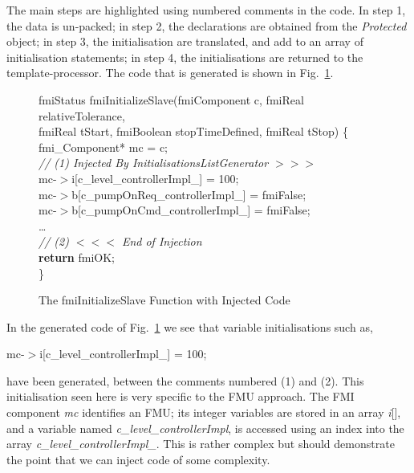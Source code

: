 \documentclass{llncs}%
\begin{document}
The main steps are highlighted using numbered comments in the code. In step 1, the data is un-packed; in step 2, the declarations are obtained from the \emph{Protected} object; in step 3, the initialisation are translated, and add to an array of initialisation statements; in step 4, the initialisations are returned to the template-processor. The code that is generated is shown in Fig.~\ref{fig:codeOut}. 
%
\begin{figure}
\centering
\begin{minipage}{0.9\textwidth}
fmiStatus fmiInitializeSlave(fmiComponent c, fmiReal relativeTolerance,\\
\hspace*{0.6cm}fmiReal tStart, fmiBoolean stopTimeDefined, fmiReal tStop) \{\\
\hspace*{0.2cm}fmi\_Component* mc = c;\\
\hspace*{0.2cm}\emph{// (1) Injected By InitialisationsListGenerator $>>>$ }\\
\hspace*{0.2cm}mc-$>$i[c\_level\_controllerImpl\_] = 100;\\
\hspace*{0.2cm}mc-$>$b[c\_pumpOnReq\_controllerImpl\_] = fmiFalse;\\
\hspace*{0.2cm}mc-$>$b[c\_pumpOnCmd\_controllerImpl\_] = fmiFalse;\\
\hspace*{0.2cm}\ldots\\
\hspace*{0.2cm}\emph{// (2) $<<<$ End of Injection}\\
\hspace*{0.2cm}\textbf{return} fmiOK;\\
\}
\end{minipage}
\caption{The fmiInitializeSlave Function with Injected Code}
\label{fig:codeOut}
\end{figure}

In the generated code of Fig.~\ref{fig:codeOut} we see that variable initialisations such as,

\begin{minipage}{\textwidth}
\centering
mc-$>$i[c\_level\_controllerImpl\_] = 100;
\end{minipage}
have been generated, between the comments numbered (1) and (2). This initialisation seen here is very specific to the FMU approach. The FMI component \emph{mc} identifies an FMU; its integer variables are stored in an array \emph{i}[], and a variable named \emph{c\_level\_controllerImpl}, is accessed using an index into the array \emph{c\_level\_controllerImpl\_}. This is rather complex but should demonstrate the point that we can inject code of some complexity.
\end{document}
